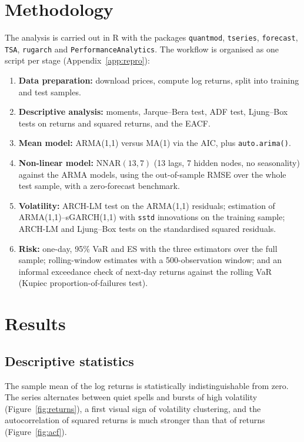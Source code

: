 \documentclass[11pt,a4paper]{article}
\begin{document}
\section{Methodology}
The analysis is carried out in \textsf{R} with the packages \texttt{quantmod}, \texttt{tseries}, \texttt{forecast}, \texttt{TSA}, \texttt{rugarch} and \texttt{PerformanceAnalytics}. The workflow is organised as one script per stage (Appendix~\ref{app:repro}):
\begin{enumerate}
  \item \textbf{Data preparation:} download prices, compute log returns, split into training and test samples.
  \item \textbf{Descriptive analysis:} moments, Jarque--Bera test, ADF test, Ljung--Box tests on returns and squared returns, and the EACF.
  \item \textbf{Mean model:} ARMA(1,1) versus MA(1) via the AIC, plus \texttt{auto.arima()}.
  \item \textbf{Non-linear model:} NNAR$(13,7)$ (13 lags, 7 hidden nodes, no seasonality) against the ARMA models, using the out-of-sample RMSE over the whole test sample, with a zero-forecast benchmark.
  \item \textbf{Volatility:} ARCH-LM test on the ARMA(1,1) residuals; estimation of ARMA(1,1)--sGARCH(1,1) with \texttt{sstd} innovations on the training sample; ARCH-LM and Ljung--Box tests on the standardised squared residuals.
  \item \textbf{Risk:} one-day, 95\% VaR and ES with the three estimators over the full sample; rolling-window estimates with a 500-observation window; and an informal exceedance check of next-day returns against the rolling VaR (Kupiec proportion-of-failures test).
\end{enumerate}

\section{Results}

\subsection{Descriptive statistics}
The sample mean of the log returns is statistically indistinguishable from zero. The series alternates between quiet spells and bursts of high volatility (Figure~\ref{fig:returns}), a first visual sign of volatility clustering, and the autocorrelation of squared returns is much stronger than that of returns (Figure~\ref{fig:acf}).
\end{document}
